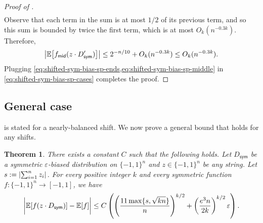 \documentclass[10pt,a4paper]{article}
\newtheorem{theorem}{Theorem}%
\theoremstyle{definition}
\newcommand{\E}{\mathop{\mathbb{E}\/}}
\newcommand{\eps}{\epsilon}
\newcommand{\ol}[1]{\overline{#1}}
\newcommand{\pmo}{\{-1,1\}}
\DeclarePairedDelimiter\abs{\lvert}{\rvert}
\def\sym{\mathsf{sym}}
\def\middle{\mathsf{mid}}
\def\sK{\ol{K}}
\newcommand{\chin}[1]{\footnote{{\bf \color{cyan}Chin}: {#1}}}
\newcommand{\chin}[1]{}
\def\epsilon{\varepsilon}
\begin{document}
\begin{proof}[Proof of ]
\begin{align*}
  \end{align*}
  Observe that each term in the sum is at most $1/2$ of its previous term, and so this sum is bounded by twice the first term, which is at most $O_k(n^{-0.3k})$.
  Therefore, 
  \begin{align} \label{eq:shifted-sym-bias-sp-middle}
    \abs[\big]{ \E\bigl[f_\middle(z \cdot D_\sym')\bigr]}
    \le 2^{-n/10} + O_k(n^{-0.3k})
    \le O_k(n^{-0.3k}) .
  \end{align}
  Plugging \cref{eq:shifted-sym-bias-sp-ends,eq:shifted-sym-bias-sp-middle} in \cref{eq:shifted-sym-bias-sp-cases} completes the proof.
  \end{proof}

\subsection{General case}

 is stated for a nearly-balanced shift.
We now prove a general bound that holds for any shifts.

\begin{theorem} \label{thm:shifted-sym-bias}
  There exists a constant $C$ such that the following holds.
  Let $D_\sym$ be a symmetric $\eps$-biased distribution on $\pmo^n$ and $z \in \pmo^n$ be any string.
  Let $s := \abs{\sum_{i=1}^n z_i}$.
  For every positive integer $k$ and every symmetric function $f\colon\pmo^n \to [-1,1]$, we have
  \[
    \abs[\bigg]{ \E[f(z \cdot D_\sym)] - \E[f] }
    \le C \left( \left( \frac{11\max\{s,\sqrt{kn}\}}{n} \right)^{k/2}  + \left(\frac{e^3n}{2k}\right)^{k/2} \eps \right) .
  \]
\end{theorem}
\end{document}
